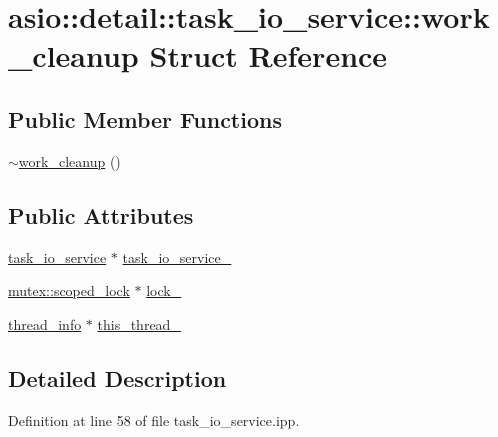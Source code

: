 \hypertarget{structasio_1_1detail_1_1task__io__service_1_1work__cleanup}{}\section{asio\+:\+:detail\+:\+:task\+\_\+io\+\_\+service\+:\+:work\+\_\+cleanup Struct Reference}
\label{structasio_1_1detail_1_1task__io__service_1_1work__cleanup}
\subsection*{Public Member Functions}
\begin{DoxyCompactItemize}
\item 
\hyperlink{structasio_1_1detail_1_1task__io__service_1_1work__cleanup_a6578e351500a2ca30c77147f0b604c09}{$\sim$work\+\_\+cleanup} ()
\end{DoxyCompactItemize}
\subsection*{Public Attributes}
\begin{DoxyCompactItemize}
\item 
\hyperlink{classasio_1_1detail_1_1task__io__service}{task\+\_\+io\+\_\+service} $\ast$ \hyperlink{structasio_1_1detail_1_1task__io__service_1_1work__cleanup_a71c21dcd60724674f4341e452f263db9}{task\+\_\+io\+\_\+service\+\_\+}
\item 
\hyperlink{classasio_1_1detail_1_1null__mutex_a2cee63c1e6051f9c6a361e9b6da8f6f7}{mutex\+::scoped\+\_\+lock} $\ast$ \hyperlink{structasio_1_1detail_1_1task__io__service_1_1work__cleanup_a50ea4d46247dd232bbeaa5853921ca95}{lock\+\_\+}
\item 
\hyperlink{structasio_1_1detail_1_1task__io__service__thread__info}{thread\+\_\+info} $\ast$ \hyperlink{structasio_1_1detail_1_1task__io__service_1_1work__cleanup_ad836fdaf2f55a75497d35d0db2ac1ff6}{this\+\_\+thread\+\_\+}
\end{DoxyCompactItemize}


\subsection{Detailed Description}


Definition at line 58 of file task\+\_\+io\+\_\+service.\+ipp.



